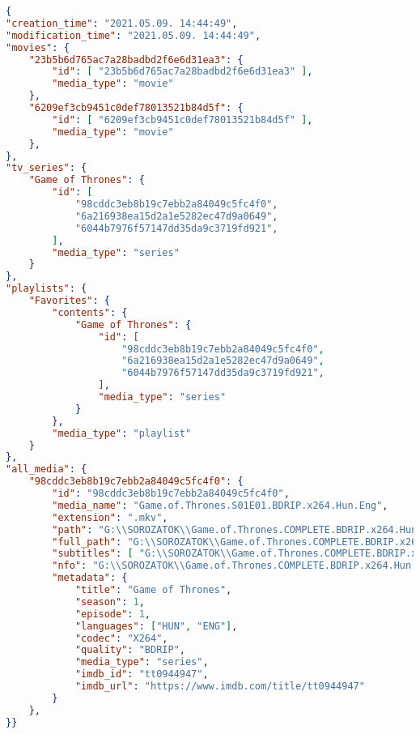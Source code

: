 \begin{lstlisting}[language={json}]
{
"creation_time": "2021.05.09. 14:44:49",
"modification_time": "2021.05.09. 14:44:49",
"movies": {
    "23b5b6d765ac7a28badbd2f6e6d31ea3": {
        "id": [ "23b5b6d765ac7a28badbd2f6e6d31ea3" ],
        "media_type": "movie"
    },
    "6209ef3cb9451c0def78013521b84d5f": {
        "id": [ "6209ef3cb9451c0def78013521b84d5f" ],
        "media_type": "movie"
    },
},
"tv_series": {
    "Game of Thrones": {
        "id": [
            "98cddc3eb8b19c7ebb2a84049c5fc4f0",
            "6a216938ea15d2a1e5282ec47d9a0649",
            "6044b7976f57147dd35da9c3719fd921",
        ],
        "media_type": "series"
    }
},
"playlists": {
    "Favorites": {
        "contents": {
            "Game of Thrones": {
                "id": [
                    "98cddc3eb8b19c7ebb2a84049c5fc4f0",
                    "6a216938ea15d2a1e5282ec47d9a0649",
                    "6044b7976f57147dd35da9c3719fd921",
                ],
                "media_type": "series"
            }
        },
        "media_type": "playlist"
    }
},
"all_media": {
    "98cddc3eb8b19c7ebb2a84049c5fc4f0": {
        "id": "98cddc3eb8b19c7ebb2a84049c5fc4f0",
        "media_name": "Game.of.Thrones.S01E01.BDRIP.x264.Hun.Eng",
        "extension": ".mkv",
        "path": "G:\\SOROZATOK\\Game.of.Thrones.COMPLETE.BDRIP.x264.Hun.Eng",
        "full_path": "G:\\SOROZATOK\\Game.of.Thrones.COMPLETE.BDRIP.x264.Hun.Eng\\Game.of.Thrones.S01E01.BDRIP.x264.Hun.Eng.mkv",
        "subtitles": [ "G:\\SOROZATOK\\Game.of.Thrones.COMPLETE.BDRIP.x264.Hun.Eng\\Game.of.Thrones.S01E01.BDRIP.x264.Hun.Eng.vtt" ],
        "nfo": "G:\\SOROZATOK\\Game.of.Thrones.COMPLETE.BDRIP.x264.Hun.Eng\\Game.of.Thrones.COMPLETE.BDRIP.x264.Hun.Eng.nfo",
        "metadata": {
            "title": "Game of Thrones",
            "season": 1,
            "episode": 1,
            "languages": ["HUN", "ENG"],
            "codec": "X264",
            "quality": "BDRIP",
            "media_type": "series",
            "imdb_id": "tt0944947",
            "imdb_url": "https://www.imdb.com/title/tt0944947"
        }
    },
}}
\end{lstlisting}

